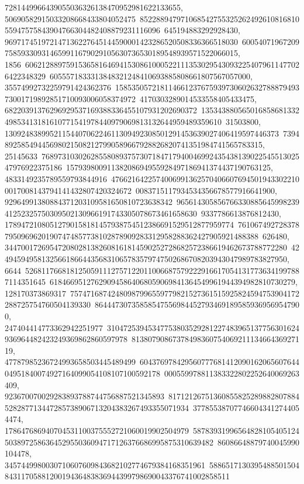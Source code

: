 {{{7281449966439055036326138470952981622133655, 50690582915033208668433804052475\
85228894797106854275532526249261081681055947575843904766304482408879231116096\
645194883292928430, 969717451972147136227645144590001423286520508336366518030\
60054071967209758593309314659911679029105630736530189548939571522066015, 1856\
60621288975915365816469415308610005221113530295430932254079611477026422348329\
6055571833313848321248410693885808661807567057000, 35574992732259791424362376\
15853505721811466123767593973060263278887949373001719892851710093006058374972\
4170303289014533558405433475, 68220391376296929537169388336455107931202690372\
13534388056501685868133249853413181610771541978440979069813132644959489359610\
31503800, 1309248389952115440706224611309492308501291453639027406419597446373\
7394892585494456980215082127990589667928826820741351984741565783315, 25145633\
76897310302628558089375730718471794004699243543813902254551302547976922375186\
15793980091138208694955928497186941374437190763125, 4833149235789559793844916\
47662164225740069913625704066076945019433022100017008143794141432807420324672\
0083715117934534356678577916641900, 92964991380884371203109581650810723638342\
96561430585676633088564599823941252325750309502130966191743305078673461658630\
9337786613876812430, 17894721080512790158181457938754512386691529512877959774\
76106749272837879509696201907474857738102878909283312958288362427905921488388\
626480, 344700172695472080281382608161814590252728682572386619462673788772280\
42494594958132566186644356831065783579747502686708203943047989783827950, 6644\
52681176681812505911127571220110066875792229166170541317736341997887114351645\
618466951276290945864068059069841364549961944394982810730279, 128170373869317\
75747168742480987996559779821527361515925824594753904172288725754760504139330\
864447307358585475569844527934691895859369569547900, 247404414773362942251977\
31047253945347753803529281227483965137756301624936964482423249369862860597978\
8138079086737849836075406921113466436927119, 47787985236724993658503445489499\
60437697842956077768141209016206560764404951840074927164099054108107100592178\
000559978811383322802252640069263409, 923670070029283893788744756887521345893\
81712126751360855825289882807884528287713447285738906713204383267493355071934\
377855387077466043412744054474, 178647686940704531100375552721060019902504979\
58783931996564828105405124503897258636452955036094717126376686995875310639482\
86086648879740045990104478, 3457449980030710607609843682102774679384168351961\
58865171303954885015048431170588120019436483836944399798690043376741002858511\
}}}
